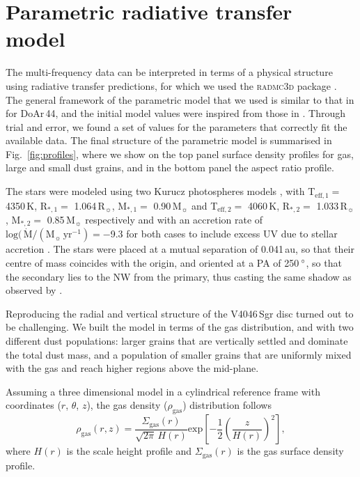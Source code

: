 \documentclass[fleqn,usenatbib,useAMS]{mnras}
\begin{document}
\section{Parametric radiative transfer model} \label{sec:model}

The multi-frequency data can be interpreted in terms of a physical structure using radiative transfer predictions, for which we used the \textsc{radmc3d} package \citep{Dullemond_2012}. The general framework of the parametric model that we used is similar to that in \citet{2018MNRAS.477.5104C} for DoAr\,44, and the initial model values were inspired from those in \citet{Rosenfeld_2013}. Through trial and error, we found a set of values for the parameters that correctly fit the available data. The final structure of the parametric model is summarised in  Fig.~\ref{fig:profiles}, where we show on the top panel surface density profiles for gas, large and small dust grains, and in the bottom panel the aspect ratio profile.

The stars were modeled using two Kurucz photospheres models \citep{1979ApJS...40....1K, 1997A&A...318..841C}, with T$_{\mathrm{eff},1} =$ 4350\,K, R$_{*,1} =$ 1.064\,R$_{\sun}$, M$_{*,1} =$ 0.90\,M$_{\sun}$ and T$_{\mathrm{eff},2} =$ 4060\,K, R$_{*,2} =$ 1.033\,R$_{\sun}$, M$_{*,2} =$ 0.85\,M$_{\sun}$ respectively and with an accretion rate of $\mathrm{log}(\,\dot{\mathrm{M}}/(\mathrm{M}_{\sun}\,\mathrm{yr^{-1}}) = -$9.3 for both cases to include excess UV due to stellar accretion \citep{10.1111/j.1365-2966.2011.19366.x}. The stars were placed at a mutual separation of 0.041\,au, so that their centre of mass coincides with the origin, and oriented at a PA of 250\,$\hbox{$^\circ$}$, so that the secondary lies to the NW from the primary, thus casting the same shadow as observed by \citet{dOrazi}.

Reproducing the radial and vertical structure of the V4046\,Sgr disc turned out to be challenging. We built the model in terms of the gas distribution, and with two different dust populations: larger grains that are vertically settled and dominate the total dust mass, and a population of smaller grains that are uniformly mixed with the gas and reach higher regions above the mid-plane. 

Assuming a three dimensional model in a cylindrical reference frame with coordinates ($r$, $\theta$, $z$), the gas density ($\rho_{\mathrm{gas}}$) distribution follows
\begin{equation}
  \rho_{\mathrm{gas}}(r,z) =\frac{\Sigma_{\mathrm{gas}}(r)}{\sqrt{2\pi} \, H(r)} \mathrm{exp}\left[-\frac{1}{2} \left(\frac{z}{H(r)}\right)^2\right],
\end{equation}
where $H(r)$ is the scale height profile and $\Sigma_{\mathrm{gas}}(r)$ is the gas surface density profile. 
\end{document}
